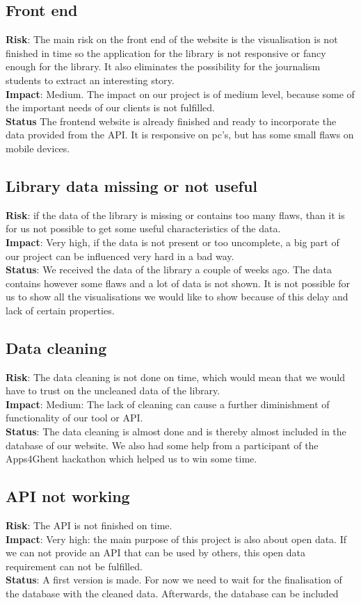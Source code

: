  \subsection{Front end}
	{\bf Risk}: The main risk on the front end of the website is the visualisation is not finished in time so the application for the library is not responsive or fancy enough for the library. It also eliminates the possibility for the journalism students to extract an interesting story.\\
	{\bf Impact}: Medium. The impact on our project is of medium level, because some of the important needs of our clients is not fulfilled.\\
	{\bf Status} The frontend website is already finished and ready to incorporate the data provided from the API. It is responsive on pc's, but has some small flaws on mobile devices. 
  \subsection{Library data missing or not useful}
	{\bf Risk}: if the data of the library is missing or contains too many flaws, than it is for us not possible to get some useful characteristics of the data.\\
	{\bf Impact}: Very high, if the data is not present or too uncomplete, a big part of our project can be influenced very hard in a bad way.\\
	{\bf Status}: We received the data of the library a couple of weeks ago. The data contains however some flaws and a lot of data is not shown. It is not possible for us to show all the visualisations we would like to show because of this delay and lack of certain properties.
  \subsection{Data cleaning}
	{\bf Risk}: The data cleaning is not done on time, which would mean that we would have to trust on the uncleaned data of the library.\\
	{\bf Impact}: Medium: The lack of cleaning can cause a further diminishment of functionality of our tool or API.\\
	{\bf Status}: The data cleaning is almost done and is thereby almost included in the database of our website. We also had some help from a participant of the Apps4Ghent hackathon which helped us to win some time.
  \subsection{API not working}
	{\bf Risk}: The API is not finished on time.\\
	{\bf Impact}: Very high: the main purpose of this project is also about open data. If we can not provide an API that can be used by others, this open data requirement can not be fulfilled.\\
	{\bf Status}: A first version is made. For now we need to wait for the finalisation of the database with the cleaned data. Afterwards, the database can be included
\newpage
